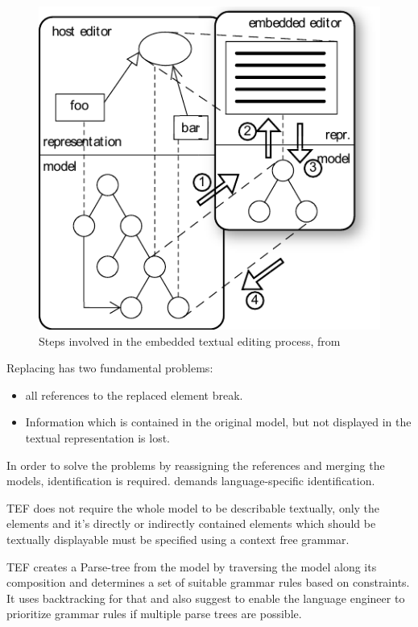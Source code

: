 \begin{figure}
\centering
\includegraphics[scale=1.2]{gfx/ex/tef} 
\caption{Steps involved in the embedded textual editing process, from \cite{TefPaper}}
\label{MM:Not:Prod}
\end{figure}

Replacing has two fundamental problems:
\begin{itemize}
	\item all references to the replaced element break.
	\item Information which is contained in the original model, but not displayed in the textual representation is lost.
\end{itemize}
In order to solve the problems by reassigning the references and merging the models, identification is required. \cite{TefPaper} demands language-specific identification. 

TEF does not require the whole model to be describable textually, only the elements and it's directly or indirectly contained elements which should be textually displayable must be specified using a context free grammar.

TEF creates a Parse-tree from the model by traversing the model along its composition and determines a set of suitable grammar rules based on constraints. It uses backtracking for that and \cite{TefPaper} also suggest to enable the language engineer to prioritize grammar rules if multiple parse trees are possible.